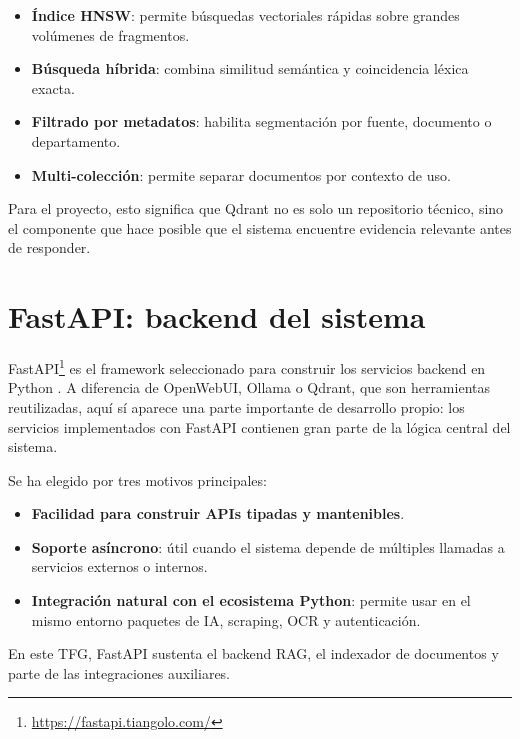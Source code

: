 \begin{itemize}
    \item \textbf{Índice HNSW}: permite búsquedas vectoriales rápidas sobre grandes volúmenes de fragmentos.
    \item \textbf{Búsqueda híbrida}: combina similitud semántica y coincidencia léxica exacta.
    \item \textbf{Filtrado por metadatos}: habilita segmentación por fuente, documento o departamento.
    \item \textbf{Multi-colección}: permite separar documentos por contexto de uso.
\end{itemize}

Para el proyecto, esto significa que Qdrant no es solo un repositorio técnico, sino el componente que hace posible que el sistema encuentre evidencia relevante antes de responder.

\section{FastAPI: backend del sistema}
\label{sec:fastapi}

FastAPI\footnote{\url{https://fastapi.tiangolo.com/}} es el framework seleccionado para construir los servicios backend en Python \cite{fastapi2024docs}. A diferencia de OpenWebUI, Ollama o Qdrant, que son herramientas reutilizadas, aquí sí aparece una parte importante de desarrollo propio: los servicios implementados con FastAPI contienen gran parte de la lógica central del sistema.

Se ha elegido por tres motivos principales:

\begin{itemize}
    \item \textbf{Facilidad para construir APIs tipadas y mantenibles}.
    \item \textbf{Soporte asíncrono}: útil cuando el sistema depende de múltiples llamadas a servicios externos o internos.
    \item \textbf{Integración natural con el ecosistema Python}: permite usar en el mismo entorno paquetes de IA, scraping, OCR y autenticación.
\end{itemize}

En este TFG, FastAPI sustenta el backend RAG, el indexador de documentos y parte de las integraciones auxiliares.

